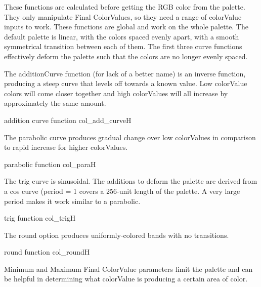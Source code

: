 These functions are calculated before getting the RGB color from the palette. They only manipulate Final ColorValues, so they need a range of colorValue inputs to work. These functions are global and work on the whole palette. The default palette is linear, with the colors spaced evenly apart, with a smooth symmetrical transition between each of them. The first three curve functions effectively deform the palette such that the colors are no longer evenly spaced.

The additionCurve function (for lack of a better name) is an inverse function, producing a steep curve that levels off towards a known value. Low colorValue colors will come closer together and high colorValues will all increase by approximately the same amount.

{addition curve function}
{col_add_curve}{H}

The parabolic curve produces gradual change over low colorValues in comparison to rapid increase for higher colorValues.

{parabolic function}
{col_para}{H}

The trig curve is sinusoidal. The additions to deform the palette are derived from a cos curve (period = 1 covers a 256-unit length of the palette. A very large period makes it work similar to a parabolic.

{trig function}
{col_trig}{H}

The round option produces uniformly-colored bands with no transitions.

{round function}
{col_round}{H}

Minimum and Maximum Final ColorValue parameters limit the palette and can be helpful in determining what colorValue is producing a certain area of color.







